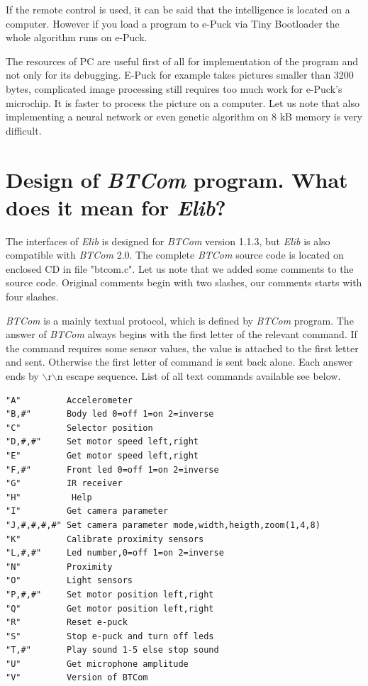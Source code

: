   If the remote control is used, it can be said that the intelligence 
  is located on a computer. However if you load a program to e-Puck via Tiny Bootloader the whole algorithm
  runs on e-Puck.
   
  The resources of PC are useful first of all for implementation of the program and not only for
  its debugging. E-Puck for example takes pictures smaller than 3200 bytes, complicated image processing still
  requires too much work for e-Puck's microchip. It is faster to process the picture
  on a computer. Let us note that also implementing a neural network or even genetic algorithm on 8 kB memory
  is very difficult.
\section{Design of {\it BTCom} program. What does it mean for {\it Elib}?}
  \label{sec:btcomdesign}
  The interfaces of {\it Elib} is designed for {\it BTCom} version 1.1.3, but {\it Elib} is also compatible with {\it BTCom} 2.0.
  The complete {\it BTCom} source code is located on enclosed CD in file "btcom.c".
  Let us note that we added some comments to the source code. Original comments begin with two slashes,
  our comments starts with four slashes.

  {\it BTCom} is a mainly textual protocol, which is defined by {\it BTCom} program. The answer of {\it BTCom} always begins 
  with the first letter of the relevant command.
  If the command requires some sensor values, the value is attached to the first letter and
  sent. Otherwise the first letter of command is sent back alone. Each answer ends by 
  $\backslash$r$\backslash$n escape sequence.
  List of all text commands available see below.
  \lstset{basicstyle=\small}
\begin{lstlisting}
"A"         Accelerometer
"B,#"       Body led 0=off 1=on 2=inverse
"C"         Selector position
"D,#,#"     Set motor speed left,right
"E"         Get motor speed left,right
"F,#"       Front led 0=off 1=on 2=inverse
"G"         IR receiver
"H"          Help
"I"         Get camera parameter
"J,#,#,#,#" Set camera parameter mode,width,heigth,zoom(1,4,8)
"K"         Calibrate proximity sensors
"L,#,#"     Led number,0=off 1=on 2=inverse
"N"         Proximity
"O"         Light sensors
"P,#,#"     Set motor position left,right
"Q"         Get motor position left,right
"R"         Reset e-puck
"S"         Stop e-puck and turn off leds
"T,#"       Play sound 1-5 else stop sound
"U"         Get microphone amplitude
"V"         Version of BTCom
\end{lstlisting}
    
